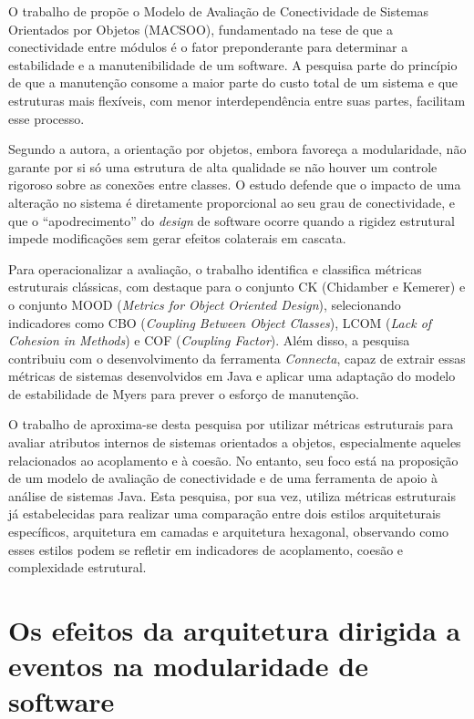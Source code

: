 O trabalho de  propõe o Modelo de Avaliação de Conectividade de Sistemas Orientados por Objetos (MACSOO), 
fundamentado na tese de que a conectividade entre módulos é o fator preponderante para determinar a estabilidade e a manutenibilidade 
de um software. A pesquisa parte do princípio de que a manutenção consome a maior parte do custo total de um sistema e que estruturas 
mais flexíveis, com menor interdependência entre suas partes, facilitam esse processo.

Segundo a autora, a orientação por objetos, embora favoreça a modularidade, não garante por si só uma estrutura de alta qualidade se não 
houver um controle rigoroso sobre as conexões entre classes. O estudo defende que o impacto de uma alteração no sistema é diretamente 
proporcional ao seu grau de conectividade, e que o ``apodrecimento'' do \textit{design} de software ocorre quando a rigidez estrutural impede 
modificações sem gerar efeitos colaterais em cascata.

Para operacionalizar a avaliação, o trabalho identifica e classifica métricas estruturais clássicas, com destaque para o conjunto 
CK (Chidamber e Kemerer) e o conjunto MOOD (\textit{Metrics for Object Oriented Design}), selecionando indicadores como CBO 
(\textit{Coupling Between Object Classes}), LCOM (\textit{Lack of Cohesion in Methods}) e COF (\textit{Coupling Factor}). 
Além disso, a pesquisa contribuiu com o desenvolvimento da ferramenta \textit{Connecta}, capaz de extrair essas métricas de sistemas 
desenvolvidos em Java e aplicar uma adaptação do modelo de estabilidade de Myers para prever o esforço de manutenção.

O trabalho de  aproxima-se desta pesquisa por utilizar métricas estruturais para avaliar atributos 
internos de sistemas orientados a objetos, especialmente aqueles relacionados ao acoplamento e à coesão. No entanto, seu foco 
está na proposição de um modelo de avaliação de conectividade e de uma ferramenta de apoio à análise de sistemas Java. 
Esta pesquisa, por sua vez, utiliza métricas estruturais já estabelecidas para realizar uma comparação entre dois estilos 
arquiteturais específicos, arquitetura em camadas e arquitetura hexagonal, observando como esses estilos podem se refletir 
em indicadores de acoplamento, coesão e complexidade estrutural.

\section{Os efeitos da arquitetura dirigida a eventos na modularidade de software}
\label{sec:os-efeitos-da-arquitetura-dirigida-a-eventos-na-modularidade-de-software}

